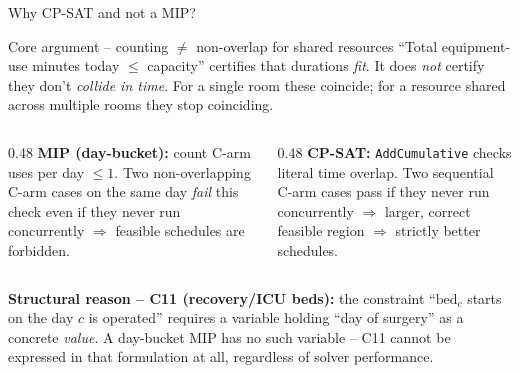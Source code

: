 \documentclass[10pt,aspectratio=169]{beamer}
\newcommand{\miplink}{\hyperlink{mip1}{\beamergotobutton{Full MIP (appendix)}}}
\begin{document}
\begin{frame}{Why CP-SAT and not a MIP?}
  \begin{block}{Core argument -- counting $\neq$ non-overlap for shared
  resources}
    ``Total equipment-use minutes today $\le$ capacity'' certifies that
    durations \emph{fit}. It does \emph{not} certify they don't
    \emph{collide in time}. For a single room these coincide; for a
    resource shared across multiple rooms they stop coinciding.
  \end{block}
  \vspace{0.2em}
  \begin{columns}
    \begin{column}{0.48\textwidth}\footnotesize
      \textbf{MIP (day-bucket):} count C-arm uses per day $\le1$.
      Two non-overlapping C-arm cases on the same day \emph{fail} this
      check even if they never run concurrently
      $\Rightarrow$ feasible schedules are forbidden.
    \end{column}
    \begin{column}{0.48\textwidth}\footnotesize
      \textbf{CP-SAT:} \texttt{AddCumulative} checks literal time
      overlap. Two sequential C-arm cases pass if they never run
      concurrently $\Rightarrow$ larger, correct feasible region
      $\Rightarrow$ strictly better schedules.
    \end{column}
  \end{columns}
  \vspace{0.4em}
  \textbf{Structural reason -- C11 (recovery/ICU beds):} the constraint
  ``$\text{bed}_c$ starts on the day $c$ is operated'' requires a
  variable holding ``day of surgery'' as a concrete \emph{value}.
  A day-bucket MIP has no such variable -- C11 cannot be expressed in
  that formulation at all, regardless of solver performance.
  \miplink
\end{frame}
\end{document}
